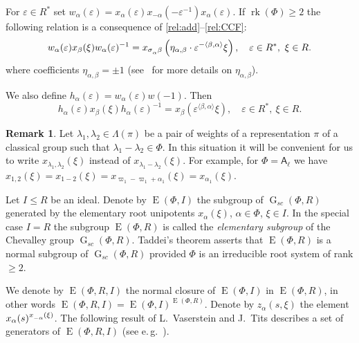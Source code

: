\documentclass[12pt]{amsart}
\numberwithin{equation}{section}
\theoremstyle{definition}
\newtheorem{rem}[equation]{Remark}
\DeclareMathOperator{\G}{G}
\DeclareMathOperator{\E}{E}
\DeclareMathOperator{\rk}{rk}
\newcommand{\rA}{\mathsf{A}}
\def\ssub#1{\mathchoice
   {_{\lower2pt\hbox{$\scriptstyle #1$}}}
   {_{\lower2pt\hbox{$\scriptstyle #1$}}}
   {_{\lower1.5pt\hbox{$\scriptscriptstyle #1$}}}
   {_{\!\lower1.5pt\hbox{$\scriptscriptstyle #1$}}}}
\begin{document}
For $\varepsilon\in R^*$ set $w_\alpha(\varepsilon) = x_\alpha(\varepsilon) x_{-\alpha}(-\varepsilon^{-1}) x_{\alpha}(\varepsilon).$
If $\rk(\Phi)\geqslant 2$ the following relation is a consequence of \ref{rel:add}--\ref{rel:CCF}:
\begin{equation}\label{rel:R3}
w_\alpha(\varepsilon) x_{\beta}(\xi) w_\alpha(\varepsilon)^{-1} =
x_{\sigma\ssub{\alpha}\beta} \left(\eta_{\alpha, \beta}\cdot\varepsilon^{-\langle\beta,\alpha \rangle}\xi\right),\quad \varepsilon\in R^*,\ \xi\in R.
\end{equation}
where coefficients $\eta_{\alpha, \beta} = \pm 1$ (see~\cite[\S13]{VP} for more details on $\eta_{\alpha, \beta}$).

We also define $h_\alpha(\varepsilon)=w_\alpha(\varepsilon)w(-1)$. Then
\begin{equation}\label{rel:R6}
h_\alpha(\varepsilon)x_\beta(\xi)h_\alpha(\varepsilon)^{-1} = x_\beta\left(\varepsilon^{\langle\beta,\alpha\rangle}\xi\right),\quad \varepsilon\in R^*,\ \xi\in R.
\end{equation}

\begin{rem} Let $\lambda_1, \lambda_2 \in \Lambda(\pi)$ be a pair of weights of a representation $\pi$ of a classical group such that $\lambda_1-\lambda_2\in \Phi$.
In this situation it will be convenient for us to write $x_{\lambda_1,\lambda_2}(\xi)$ instead of $x_{\lambda_1-\lambda_2}(\xi)$.
For example, for $\Phi=\rA_\ell$ we have $x_{1,2}(\xi)=x_{1-2}(\xi)=x_{\varpi_1 - \varpi_1 + \alpha_1}(\xi) = x_{\alpha_1}(\xi)$. \end{rem}

Let $I\leq R$ be an ideal. Denote by $\E(\Phi, I)$ the subgroup of $\G_{sc}(\Phi, R)$ generated by the elementary root unipotents $x_\alpha(\xi)$, $\alpha\in\Phi$, $\xi\in I$.
In the special case $I=R$ the subgroup $\E(\Phi, R)$ is called the {\it elementary subgroup} of the Chevalley group $\G_{sc}(\Phi, R)$.
Taddei's theorem asserts that $\E(\Phi, R)$ is a normal subgroup of $\G_{sc}(\Phi, R)$ provided $\Phi$ is an irreducible root system of rank $\geqslant 2$.

We denote by $\E(\Phi, R, I)$ the normal closure of $\E(\Phi, I)$ in $\E(\Phi, R)$, in other words $\E(\Phi, R, I) = \E(\Phi, I)^{\E(\Phi, R)}$.
Denote by $z_\alpha(s, \xi)$ the element $x_\alpha(s)^{x\ssub{-\alpha}(\xi)}$.
The following result of L.~Vaserstein and J.~Tits describes a set of generators of $\E(\Phi, R, I)$ (see e.\,g.~\cite[Theorem~2]{Va86}).
\end{document}
